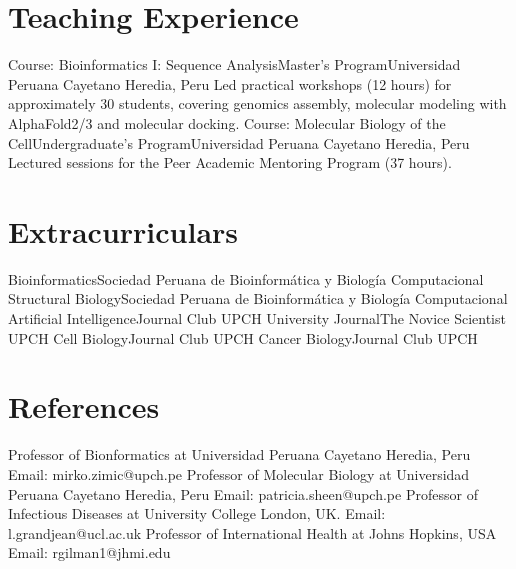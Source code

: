 \documentclass[11pt,a4paper,sans]{moderncv}
\begin{document}
\section{Teaching Experience}
    {Course: Bioinformatics I: Sequence Analysis}{Master’s Program}{Universidad Peruana Cayetano Heredia, Peru}
    {Led practical workshops (12 hours) for approximately 30 students, covering genomics assembly, molecular modeling with AlphaFold2/3 and molecular docking.
    }
    {Course: Molecular Biology of the Cell}{Undergraduate’s Program}{Universidad Peruana Cayetano Heredia, Peru}
    {Lectured sessions for the Peer Academic Mentoring Program (37 hours). 
    }

\section{Extracurriculars}

    {Bioinformatics}{Sociedad Peruana de Bioinformática y Biología Computacional}{}
    {}
    {Structural Biology}{Sociedad Peruana de Bioinformática y Biología Computacional}{}
    {}
    {Artificial Intelligence}{Journal Club UPCH}{}
    {}
    {University Journal}{The Novice Scientist UPCH}{}
    {}
    {Cell Biology}{Journal Club UPCH}{}
    {}
    {Cancer Biology}{Journal Club UPCH}{}
    {}
  

\section{References}
    {Professor of Bionformatics at Universidad Peruana Cayetano Heredia, Peru}{}{}
    {Email: mirko.zimic@upch.pe}
    {Professor of Molecular Biology at Universidad Peruana Cayetano Heredia, Peru}{}{}
    {Email: patricia.sheen@upch.pe}
    {Professor of Infectious Diseases at University College London, UK.}{}{}
    {Email: l.grandjean@ucl.ac.uk}
    {Professor of International Health at Johns Hopkins, USA}{}{}
    {Email: rgilman1@jhmi.edu}


\end{document}
